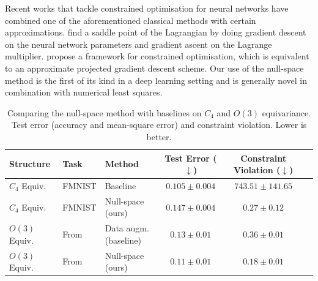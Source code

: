 Recent works that tackle constrained optimisation for neural networks have combined one of the aforementioned classical methods with certain approximations. \citet{gallego2022controlled} find a saddle point of the Lagrangian by doing gradient descent on the neural network parameters and gradient ascent on the Lagrange multiplier. \citet{donti2021dc3} propose a framework for constrained optimisation, which is equivalent to an approximate projected gradient descent scheme. 
Our use of the null-space method is the first of its kind in a deep learning setting and is generally novel in combination with numerical least squares. 


\begin{table}[t]
\caption{Comparing the null-space method with baselines on $C_4$ and $O(3)$ equivariance. Test error (accuracy and mean-square error) and constraint violation. Lower is better.}
\vspace{-3mm}
\label{tab:equiv_invariance_results}
\begin{center}
\begin{small}
\begin{tabular}{l l l c c c}
\toprule
Structure & Task & Method & Test Error ($\downarrow$) & Constraint Violation ($\downarrow$) \\
\midrule
$C_4$ Equiv. & FMNIST & Baseline & $\mathbf{0.105 \pm 0.004}$ & $743.51\pm141.65$ \\
$C_4$ Equiv. & FMNIST & Null-space (ours) & $0.147 \pm 0.004$ & $\mathbf{0.27\pm0.12}$ \\
\midrule
$O(3)$ Equiv. & From \citep{finzi2021practical} & Data augm.\@ (baseline) & $0.13 \pm 0.01$ & $0.36 \pm 0.01$ \\
$O(3)$ Equiv. & From \citep{finzi2021practical} & Null-space (ours) & $\mathbf{0.11 \pm 0.01}$ & $\mathbf{0.18 \pm 0.01}$ \\
\bottomrule
\end{tabular}
\end{small}
\end{center}
\end{table}



